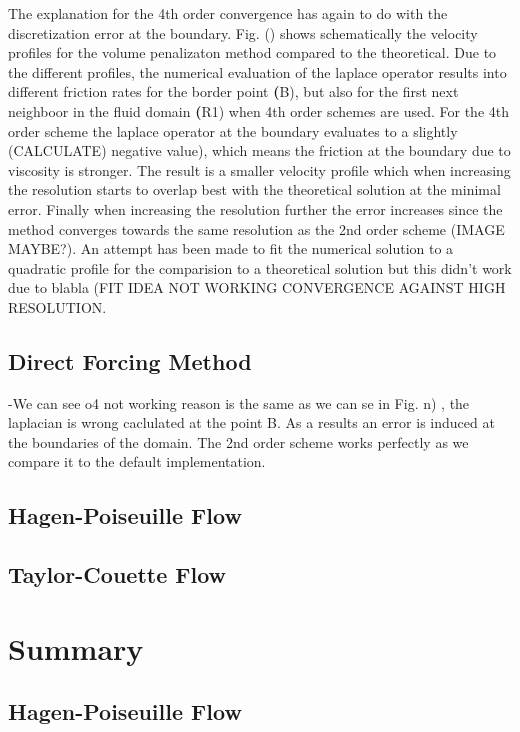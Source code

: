 The explanation for the 4th order convergence has again to do with the discretization error at the boundary.
Fig. () shows schematically the velocity profiles for the volume penalizaton method compared to the theoretical.
Due to the different  profiles, the numerical evaluation of the laplace operator results
into different friction rates for the border point \textbf(B), but  also for the first next neighboor in the fluid domain \textbf(R1) when 4th order schemes are used.
For the 4th order scheme the laplace operator at the boundary evaluates to a slightly (CALCULATE) negative value), which means the friction at the boundary due to
viscosity is stronger. The result is a smaller velocity profile which when increasing the resolution starts to overlap best with the theoretical solution at the minimal error.
Finally when increasing the resolution further the error increases since the method converges towards the same resolution as the 2nd order scheme (IMAGE MAYBE?).
An attempt has been made to fit the numerical solution to a quadratic profile for the comparision to a theoretical solution but this didn't work due to blabla
(FIT IDEA NOT WORKING CONVERGENCE AGAINST HIGH RESOLUTION.

\subsection{Direct Forcing Method}
-We can see o4 not working reason is the same as we can se in Fig. n) , the laplacian is wrong caclulated at the point B.
As a results an error is induced at the boundaries of the domain.
The 2nd order scheme works perfectly as we compare it to the default implementation.


\subsection{Hagen-Poiseuille Flow}
\subsection{Taylor-Couette Flow}
\section{Summary}

\clearpage
\clearpage

\subsection{Hagen-Poiseuille Flow}

